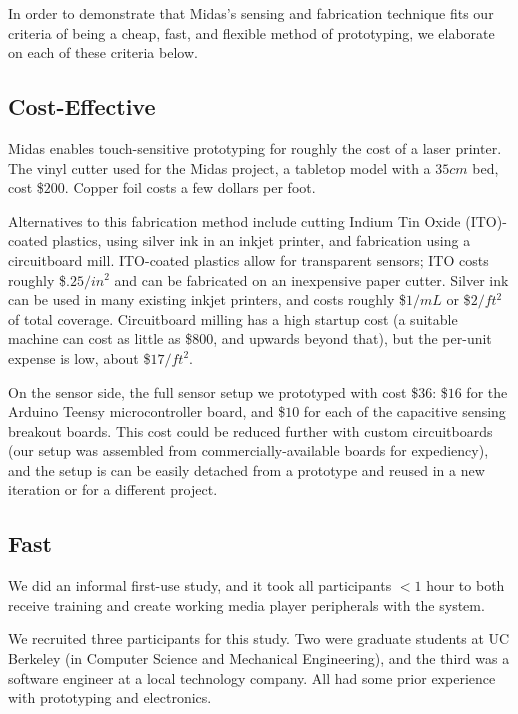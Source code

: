     In order to demonstrate that Midas's sensing and fabrication technique fits our criteria of being a cheap, fast, and flexible method of prototyping, we elaborate on each of these criteria below.

    \subsection{Cost-Effective}
    
    Midas enables touch-sensitive prototyping for roughly the cost of a laser printer. The vinyl cutter used for the Midas project, a tabletop model with a $35cm$ bed, cost \$$200$. Copper foil costs a few dollars per foot.
    
    Alternatives to this fabrication method include cutting Indium Tin Oxide (ITO)-coated plastics, using silver ink in an inkjet printer, and fabrication using a circuitboard mill. ITO-coated plastics allow for transparent sensors; ITO costs roughly \$$.25/in^2$ and can be fabricated on an inexpensive paper cutter. Silver ink can be used in many existing inkjet printers, and costs roughly \$$1/mL$ or \$$2/ft^2$ of total coverage. Circuitboard milling has a high startup cost (a suitable machine can cost as little as \$$800$, and upwards beyond that), but the per-unit expense is low, about \$$17/ft^2$.
    
    On the sensor side, the full sensor setup we prototyped with cost \$$36$: \$$16$ for the Arduino Teensy microcontroller board, and \$$10$ for each of the capacitive sensing breakout boards. This cost could be reduced further with custom circuitboards (our setup was assembled from commercially-available boards for expediency), and the setup is can be easily detached from a prototype and reused in a new iteration or for a different project.
    
    \subsection{Fast}
    
    We did an informal first-use study, and it took all participants $<1$ hour to both receive training and create working media player peripherals with the system.
    
    We recruited three participants for this study. Two were graduate students at UC Berkeley (in Computer Science and Mechanical Engineering), and the third was a software engineer at a local technology company. All had some prior experience with prototyping and electronics.

